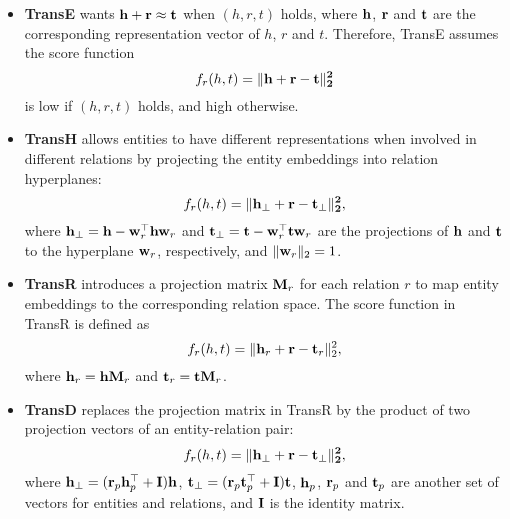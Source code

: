 \documentclass[sigconf]{acmart}
\begin{document}
		\begin{itemize}
			\item
			\textbf{TransE} \cite{bordes2013translating} wants $\bf h + \bf r \approx \bf t$ when $(h, r, t)$ holds, where $\bf h$, $\bf r$ and $\bf t$ are the corresponding representation vector of $h$, $r$ and $t$.
			Therefore, TransE assumes the score function
			\begin{equation}
				f_r(h, t) = \| \bf h + \bf r - \bf t \|_2^2
			\end{equation}
			is low if $(h, r, t)$ holds, and high otherwise.
		
			\item
			\textbf{TransH} \cite{wang2014knowledge} allows entities to have different representations when involved in different relations by projecting the entity embeddings into relation hyperplanes:
\begin{equation}
				f_r(h, t) = \| \bf h_\perp + \bf r - \bf t_\perp \|_2^2,
			\end{equation}
			where ${\bf h}_\perp = {\bf h} - {\bf w}_r^\top {\bf h} {\bf w}_r$ and ${\bf t}_\perp = {\bf t} - {\bf w}_r^\top {\bf t} {\bf w}_r$ are the projections of $\bf h$ and $\bf t$ to the hyperplane ${\bf w}_r$, respectively, and $\| {\bf w}_r \|_2 = 1$.
		
			\item
			\textbf{TransR} \cite{lin2015learning} introduces a projection matrix ${\bf M}_r$ for each relation $r$ to map entity embeddings to the corresponding relation space.
			The score function in TransR is defined as
			\begin{equation}
				f_r(h, t) = \| {\bf h}_r + {\bf r} - {\bf t}_r \|_2^2,
			\end{equation}
			where ${\bf h}_r = {\bf h} {\bf M}_r$ and ${\bf t}_r = {\bf t} {\bf M}_r$.
		
			\item
			\textbf{TransD} \cite{ji2015knowledge} replaces the projection matrix in TransR by the product of two projection vectors of an entity-relation pair:
			\begin{equation}
				f_r(h, t) = \| \bf h_\perp + \bf r - \bf t_\perp \|_2^2,
			\end{equation}
			where ${\bf h}_\perp = ({\bf r}_p {\bf h}_p^\top + {\bf I}) {\bf h}$, ${\bf t}_\perp = ({\bf r}_p {\bf t}_p^\top + {\bf I}) {\bf t}$, ${\bf h}_p$, ${\bf r}_p$ and ${\bf t}_p$ are another set of vectors for entities and relations, and $\bf I$ is the identity matrix.
		\end{itemize}
		
\end{document}
